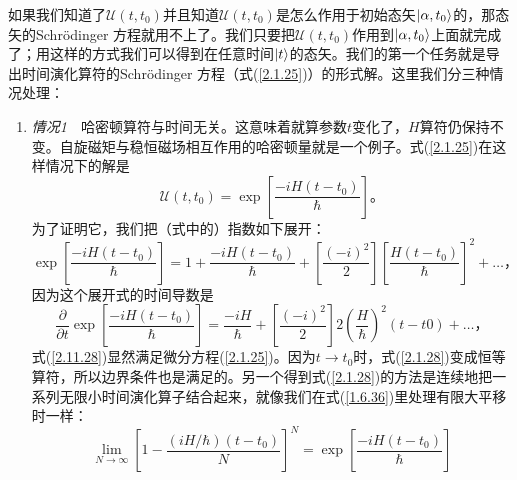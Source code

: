 \documentclass[UTF8,twoside]{ctexart}
\newcommand{\cu}{\mathcal{U}}
\begin{document}
如果我们知道了$\cu(t,t_0)$并且知道$\cu(t,t_0)$是怎么作用于初始态矢$\ket{\alpha,t_0}$的，那态矢的Schr\"{o}dinger 方程就用不上了。我们只要把$\cu(t,t_0)$作用到$\ket{\alpha,t_0}$上面就完成了；用这样的方式我们可以得到在任意时间$\ket{t}$的态矢。我们的第一个任务就是导出时间演化算符的Schr\"{o}dinger 方程（式(\ref{2.1.25})）的形式解。这里我们分三种情况处理：
\begin{enumerate}
\item {\it 情况1}~~哈密顿算符与时间无关。这意味着就算参数$t$变化了，$H$算符仍保持不变。自旋磁矩与稳恒磁场相互作用的哈密顿量就是一个例子。式(\ref{2.1.25})在这样情况下的解是
\begin{equation}\label{2.1.28}
\cu(t,t_0)=\exp\left[\frac{-iH(t-t_0)}{\hbar}\right]。
\end{equation}
为了证明它，我们把（式中的）指数如下展开：
\begin{equation}\label{2.1.29}
\exp\left[\frac{-iH(t-t_0)}{\hbar}\right]=1+\frac{-iH(t-t_0)}{\hbar}+\left[\frac{{(-i)}^2}{2}\right]{\left[\frac{H(t-t_0)}{\hbar}\right]}^2+\dots ，
\end{equation}
因为这个展开式的时间导数是
\begin{equation}\label{2.1.30}
\frac{\partial}{\partial t}\exp\left[\frac{-iH(t-t_0)}{\hbar}\right]=\frac{-iH}{\hbar}+\left[\frac{{(-i)}^2}{2}\right]2{\left(\frac{H}{\hbar}\right)}^2 (t-t0)+\dots ，
\end{equation}
式(\ref{2.11.28})显然满足微分方程(\ref{2.1.25})。因为$t\rightarrow t_0$时，式(\ref{2.1.28})变成恒等算符，所以边界条件也是满足的。另一个得到式(\ref{2.1.28})的方法是连续地把一系列无限小时间演化算子结合起来，就像我们在式(\ref{1.6.36})里处理有限大平移时一样：
\begin{equation}\label{2.1.31}
\lim_{N\rightarrow \infty}{\left[1-\frac{(iH/\hbar)(t-t_0)}{N}\right]}^N=\exp\left[\frac{-iH(t-t_0)}{\hbar}\right]
\end{equation}
\end{enumerate}
\end{document}
